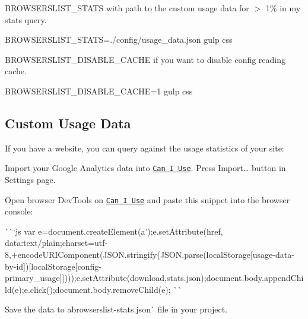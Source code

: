 \begin{DoxyItemize}
\item {\ttfamily B\+R\+O\+W\+S\+E\+R\+S\+L\+I\+S\+T\+\_\+\+S\+T\+A\+TS} with path to the custom usage data for {\ttfamily $>$ 1\% in my stats} query.
\end{DoxyItemize}


\begin{DoxyCode}
BROWSERSLIST\_STATS=./config/usage\_data.json gulp css
\end{DoxyCode}



\begin{DoxyItemize}
\item {\ttfamily B\+R\+O\+W\+S\+E\+R\+S\+L\+I\+S\+T\+\_\+\+D\+I\+S\+A\+B\+L\+E\+\_\+\+C\+A\+C\+HE} if you want to disable config reading cache.
\end{DoxyItemize}


\begin{DoxyCode}
BROWSERSLIST\_DISABLE\_CACHE=1 gulp css
\end{DoxyCode}


\subsection*{Custom Usage Data}

If you have a website, you can query against the usage statistics of your site\+:


\begin{DoxyEnumerate}
\item Import your Google Analytics data into \href{http://caniuse.com/}{\tt Can I Use}. Press {\ttfamily Import…} button in Settings page.
\item Open browser Dev\+Tools on \href{http://caniuse.com/}{\tt Can I Use} and paste this snippet into the browser console\+:

\`{}\`{}`js var e=document.\+create\+Element(\textquotesingle{}a');e.\+set\+Attribute(\textquotesingle{}href\textquotesingle{}, \textquotesingle{}data\+:text/plain;charset=utf-\/8,\textquotesingle{}+encode\+U\+R\+I\+Component(J\+S\+O\+N.\+stringify(J\+S\+O\+N.\+parse(local\+Storage\mbox{[}\textquotesingle{}usage-\/data-\/by-\/id\textquotesingle{}\mbox{]})\mbox{[}local\+Storage\mbox{[}\textquotesingle{}config-\/primary\+\_\+usage\textquotesingle{}\mbox{]}\mbox{]})));e.\+set\+Attribute(\textquotesingle{}download\textquotesingle{},\textquotesingle{}stats.\+json\textquotesingle{});document.\+body.\+append\+Child(e);e.\+click();document.\+body.\+remove\+Child(e); \`{}\`{}{\ttfamily }
\item {\ttfamily Save the data to a}browserslist-\/stats.\+json\`{} file in your project.
\end{DoxyEnumerate}

